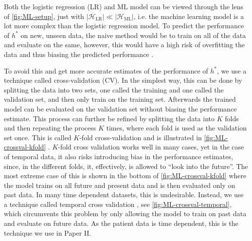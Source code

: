 Both the logistic regression (LR) and ML model can be viewed through the lens of \autoref{fig:ML-setup}, just with $|\mathcal{H}_\mathrm{LR}| \ll |\mathcal{H}_\mathrm{ML}|$, i.e. the machine learning model is a lot more complex than the logistic regression model. To predict the performance of $h^*$ on new, unseen data, the naive method would be to train on all of the data and evaluate on the same, however, this would have a high risk of overfitting the data and thus biasing the predicted performance \parencite{abu-mostafaLearningData2012a}.

To avoid this and get more accurate estimates of the performance of $h^*$, we use a technique called cross-validation (CV). In the simplest way, this can be done by splitting the data into two sets, one called the training and one called the validation set, and then only train on the training set. Afterwards the trained model can be evaluated on the validation set without biasing the performance estimate. This process can further be refined by splitting the data into $K$ folds and then repeating the process $K$ times, where each fold is used as the validation set once.
This is called $K$-fold cross-validation and is illustrated in \autoref{fig:ML-crossval-kfold} \autocite{murphyMachineLearningProbabilistic2012,hastieElementsStatisticalLearning2016}.
$K$-fold cross validation works well in many cases, yet in the case of temporal data, it also risks introducing bias in the performance estimates, since, in the different folds, it, effectively, is allowed to ``look into the future''. The most extreme case of this is shown in the bottom of \autoref{fig:ML-crossval-kfold} where the model trains on all future and present data and is then evaluated only on past data. In many time dependent datasets, this is undesirable. Instead, we use a technique called temporal cross validation \parencite{tashmanOutofsampleTestsForecasting2000a}, see \autoref{fig:ML-crossval-temporal}, which circumvents this problem by only allowing the model to train on past data and evaluate on future data. As the patient data is time dependent, this is the technique we use in Paper II.


